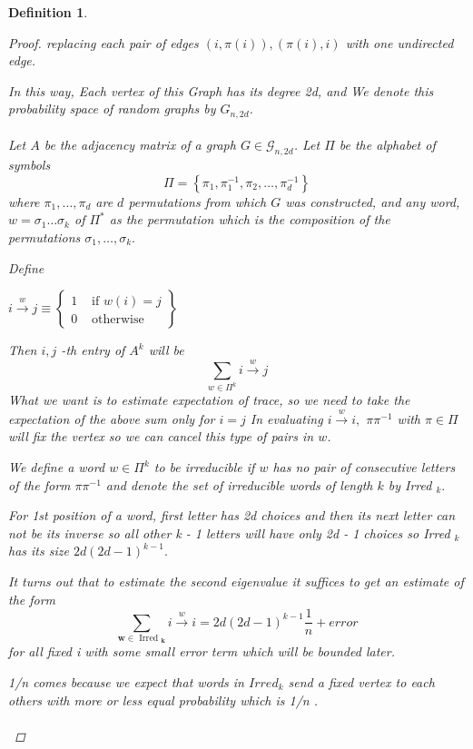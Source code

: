 \documentclass[oneside]{book}
\newtheorem{mydef}{Definition}
\begin{document}
\begin{mydef}
\begin{proof}
replacing each pair of edges $(i, \pi(i)), (\pi(i), i) $ with one undirected edge.\par In this way, Each vertex of this Graph has its degree 2d, and  We denote
this probability space of random graphs by $G_{n,2d}$. \\\\
Let $A$ be the adjacency matrix of a graph $G \in \mathscr{G}_{n, 2 d}$. Let $\Pi$ be the alphabet of symbols
$$
\Pi=\left\{\pi_{1}, \pi_{1}^{-1}, \pi_{2}, \ldots, \pi_{d}^{-1}\right\}
$$
where  $\pi_{1}, \ldots, \pi_{d}$ are  $d$ permutations from which $G$ was constructed, and any word, $w=\sigma_{1} \ldots \sigma_{k}$ of $\Pi^{*}$ as the permutation which is the composition of the permutations $\sigma_{1}, \ldots, \sigma_{k} .$ \par
Define  \begin{center}
   $i \stackrel{w}{\rightarrow} j \equiv\left\{\begin{array}{ll}
1 & \text { if  }  w(i)=j \\
0 & \text { otherwise }
\end{array}\right\}$ 
\end{center}
Then  $i, j$ -th entry of $A^{k}$ will be 
$$
\sum_{w \in \Pi^{k}} i \stackrel{w}{\rightarrow} j
$$
What we want is  to estimate expectation of  trace, so we need to take the expectation of the above sum only for  $i = j$      
 In evaluating $i \stackrel{w}{\rightarrow} i,$  $\pi \pi^{-1}$ with $\pi \in \Pi $    will fix the vertex so we can cancel this type of pairs in  $w$.\par
 We define a word $w \in \Pi^{k}$ to be irreducible if $w$ has no pair of consecutive letters of the form $\pi \pi^{-1}$ and denote the set of irreducible words of length $k$ by Irred $_{k} .$\par
 For 1st position of a word, first letter has  2d choices and then its next letter can not be its inverse so all other k - 1 letters will have only 2d - 1 choices so
  Irred $_{k}$ has its  size $2 d(2 d-1)^{k-1} .$ \par 
  It turns out that to estimate the second eigenvalue it suffices
to get an estimate of the form
$$
   \sum_{\boldsymbol{w} \in \text { Irred }_{\boldsymbol{k}}} i \stackrel{w}{\rightarrow} i=2 d(2 d-1)^{k-1} \frac{1}{n} + error 
$$
for all fixed i with some small error term which will be bounded later.\par
 1/n comes because we expect  that words in $Irred_{k} $ send a fixed vertex to each  others with more or less equal probability which is 1/n . \\\\

\end{proof}
\end{mydef}
\end{document}
